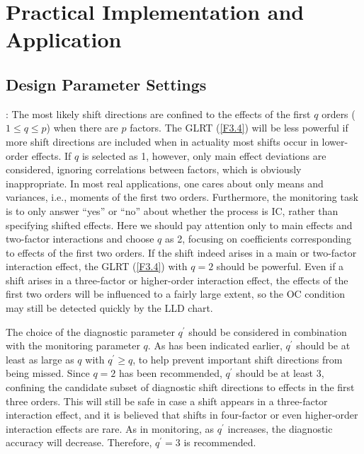 \section{Practical Implementation and Application}\label{sec3.5}

\subsection{Design Parameter Settings}

: The most likely shift
directions are confined to the effects of the first $q$ orders ($1\leq q\leq p$)
when there are $p$ factors. The GLRT (\ref{F3.4}) will be less powerful if more
shift directions are included when in actuality most shifts occur in lower-order
effects. If $q$ is selected as 1, however, only main effect deviations are
considered, ignoring correlations between factors, which is obviously inappropriate.
In most real applications, one cares about only means and variances, i.e., moments
of the first two orders. Furthermore, the monitoring task is to only answer ``yes''
or ``no'' about whether the process is IC, rather than specifying shifted effects.
Here we should pay attention only to main effects and two-factor interactions and
choose $q$ as 2, focusing on coefficients corresponding to effects of the first two
orders. If the shift indeed arises in a main or two-factor interaction effect, the
GLRT (\ref{F3.4}) with $q=2$ should be powerful. Even if a shift arises in a
three-factor or higher-order interaction effect, the effects of the first two orders
will be influenced to a fairly large extent, so the OC condition may still be
detected quickly by the LLD chart.

The choice of the diagnostic parameter $q^{\prime}$ should be considered in
combination with the monitoring parameter $q$. As has been indicated earlier,
$q^{\prime}$ should be at least as large as $q$ with $q^{\prime}\geq q$, to help
prevent important shift directions from being missed. Since $q=2$ has been
recommended, $q^{\prime}$ should be at least 3, confining the candidate subset of
diagnostic shift directions to effects in the first three orders. This will still be
safe in case a shift appears in a three-factor interaction effect, and it is
believed that shifts in four-factor or even higher-order interaction effects are
rare. As in monitoring, as $q^{\prime}$ increases, the diagnostic accuracy will
decrease. Therefore, $q^{\prime}=3$ is recommended.

